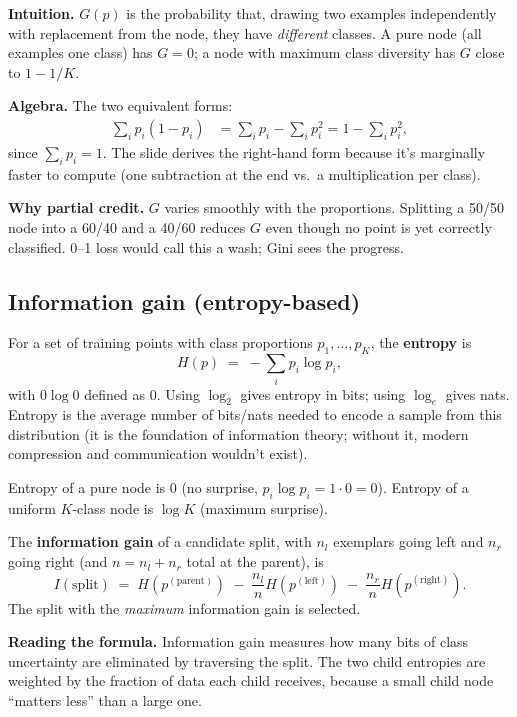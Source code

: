 \documentclass[11pt, a4paper]{article}
\begin{document}
\textbf{Intuition.} $G(p)$ is the probability that, drawing two examples independently with replacement from the node, they have \emph{different} classes. A pure node (all examples one class) has $G = 0$; a node with maximum class diversity has $G$ close to $1 - 1/K$.

\textbf{Algebra.} The two equivalent forms:
\begin{align*}
\sum_i p_i(1 - p_i) &= \sum_i p_i - \sum_i p_i^2 = 1 - \sum_i p_i^2,
\end{align*}
since $\sum_i p_i = 1$. The slide derives the right-hand form because it's marginally faster to compute (one subtraction at the end vs.\ a multiplication per class).

\textbf{Why partial credit.} $G$ varies smoothly with the proportions. Splitting a 50/50 node into a 60/40 and a 40/60 reduces $G$ even though no point is yet correctly classified. 0--1 loss would call this a wash; Gini sees the progress.

\subsection{Information gain (entropy-based)}

\begin{defbox}[Entropy]
For a set of training points with class proportions $p_1, \ldots, p_K$, the \textbf{entropy} is
\[
H(p) \;=\; -\sum_i p_i \log p_i,
\]
with $0 \log 0$ defined as $0$. Using $\log_2$ gives entropy in bits; using $\log_e$ gives nats. Entropy is the average number of bits/nats needed to encode a sample from this distribution (it is the foundation of information theory; without it, modern compression and communication wouldn't exist).
\end{defbox}

Entropy of a pure node is $0$ (no surprise, $p_i \log p_i = 1 \cdot 0 = 0$). Entropy of a uniform $K$-class node is $\log K$ (maximum surprise).

\begin{defbox}
The \textbf{information gain} of a candidate split, with $n_l$ exemplars going left and $n_r$ going right (and $n = n_l + n_r$ total at the parent), is
\[
I(\text{split}) \;=\; H(p^{(\text{parent})}) \;-\; \frac{n_l}{n} H(p^{(\text{left})}) \;-\; \frac{n_r}{n} H(p^{(\text{right})}).
\]
The split with the \emph{maximum} information gain is selected.
\end{defbox}

\textbf{Reading the formula.} Information gain measures how many bits of class uncertainty are eliminated by traversing the split. The two child entropies are weighted by the fraction of data each child receives, because a small child node ``matters less'' than a large one.
\end{document}
